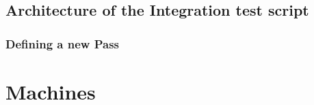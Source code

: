 \subsection{Architecture of the Integration test script}
\subsubsection{Defining a new Pass}

\section{Machines}
